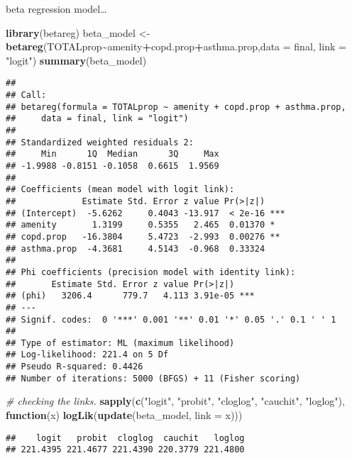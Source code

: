 \documentclass[]{article}
\newenvironment{Shaded}{\begin{snugshade}}{\end{snugshade}}
\newcommand{\CommentTok}[1]{\textcolor[rgb]{0.56,0.35,0.01}{\textit{#1}}}
\newcommand{\ControlFlowTok}[1]{\textcolor[rgb]{0.13,0.29,0.53}{\textbf{#1}}}
\newcommand{\DataTypeTok}[1]{\textcolor[rgb]{0.13,0.29,0.53}{#1}}
\newcommand{\KeywordTok}[1]{\textcolor[rgb]{0.13,0.29,0.53}{\textbf{#1}}}
\newcommand{\NormalTok}[1]{#1}
\newcommand{\OperatorTok}[1]{\textcolor[rgb]{0.81,0.36,0.00}{\textbf{#1}}}
\newcommand{\StringTok}[1]{\textcolor[rgb]{0.31,0.60,0.02}{#1}}
\begin{document}
beta regression model\ldots{}

\begin{Shaded}
\begin{Highlighting}[]
\KeywordTok{library}\NormalTok{(betareg)}
\NormalTok{beta\_model \textless{}{-}}\StringTok{ }\KeywordTok{betareg}\NormalTok{(TOTALprop}\OperatorTok{\textasciitilde{}}\NormalTok{amenity}\OperatorTok{+}\NormalTok{copd.prop}\OperatorTok{+}\NormalTok{asthma.prop,}\DataTypeTok{data =}\NormalTok{ final, }\DataTypeTok{link =} \StringTok{"logit"}\NormalTok{)}
\KeywordTok{summary}\NormalTok{(beta\_model)}
\end{Highlighting}
\end{Shaded}

\begin{verbatim}
## 
## Call:
## betareg(formula = TOTALprop ~ amenity + copd.prop + asthma.prop, 
##     data = final, link = "logit")
## 
## Standardized weighted residuals 2:
##     Min      1Q  Median      3Q     Max 
## -1.9988 -0.8151 -0.1058  0.6615  1.9569 
## 
## Coefficients (mean model with logit link):
##             Estimate Std. Error z value Pr(>|z|)    
## (Intercept)  -5.6262     0.4043 -13.917  < 2e-16 ***
## amenity       1.3199     0.5355   2.465  0.01370 *  
## copd.prop   -16.3804     5.4723  -2.993  0.00276 ** 
## asthma.prop  -4.3681     4.5143  -0.968  0.33324    
## 
## Phi coefficients (precision model with identity link):
##       Estimate Std. Error z value Pr(>|z|)    
## (phi)   3206.4      779.7   4.113 3.91e-05 ***
## ---
## Signif. codes:  0 '***' 0.001 '**' 0.01 '*' 0.05 '.' 0.1 ' ' 1 
## 
## Type of estimator: ML (maximum likelihood)
## Log-likelihood: 221.4 on 5 Df
## Pseudo R-squared: 0.4426
## Number of iterations: 5000 (BFGS) + 11 (Fisher scoring)
\end{verbatim}

\begin{Shaded}
\begin{Highlighting}[]
\CommentTok{\# checking the links.}
\KeywordTok{sapply}\NormalTok{(}\KeywordTok{c}\NormalTok{(}\StringTok{"logit"}\NormalTok{, }\StringTok{"probit"}\NormalTok{, }\StringTok{"cloglog"}\NormalTok{, }\StringTok{"cauchit"}\NormalTok{, }\StringTok{"loglog"}\NormalTok{),}
\ControlFlowTok{function}\NormalTok{(x) }\KeywordTok{logLik}\NormalTok{(}\KeywordTok{update}\NormalTok{(beta\_model, }\DataTypeTok{link =}\NormalTok{ x)))}
\end{Highlighting}
\end{Shaded}

\begin{verbatim}
##    logit   probit  cloglog  cauchit   loglog 
## 221.4395 221.4677 221.4390 220.3779 221.4800
\end{verbatim}
\end{document}
